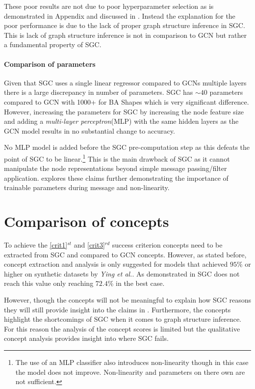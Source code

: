 These poor results are not due to poor hyperparameter selection as is demonstrated in Appendix  and discussed in .
Instead the explanation for the poor performance is due to the lack of proper graph structure inference in SGC.
This is lack of graph structure inference is not in comparison to GCN but rather a fundamental property of SGC.

\paragraph{Comparison of parameters}
Given that SGC uses a single linear regressor compared to GCNs multiple layers there is a large discrepancy in number of parameters.
SGC has $\sim40$ parameters compared to GCN with 1000+ for BA Shapes which is very significant difference.
However, increasing the parameters for SGC by increasing the node feature size and adding a \emph{multi-layer perceptron}(MLP) with the same hidden layers as the GCN model results in no substantial change to accuracy.

No MLP model is added before the SGC pre-computation step as this defeats the point of SGC to be linear.\footnote{The use of an MLP classifier also introduces non-linearity though in this case the model does not improve. Non-linearity and parameters on there own are not sufficient.}
This is the main drawback of SGC as it cannot manipulate the node representations beyond simple message passing/filter application.
 explores these claims further demonstrating the importance of trainable parameters during message and non-linearity.

\section{Comparison of concepts}
\label{sec:comp-concept}

To achieve the \ref{crit1}$^{st}$ and \ref{crit3}$^{rd}$ success criterion concepts need to be extracted from SGC and compared to GCN concepts.
However, as stated before, concept extraction and analysis is only suggested for models that achieved $95$\% or higher on synthetic datasets by \textit{Ying et al.}\cite{ying2019gnnexplainer}.
As demonstrated in  SGC does not reach this value only reaching $72.4$\% in the best case.

However, though the concepts will not be meaningful to explain how SGC reasons they will still provide insight into the claims in .
Furthermore, the concepts highlight the shortcomings of SGC when it comes to graph structure inference.
For this reason the analysis of the concept scores is limited but the qualitative concept analysis provides insight into where SGC fails.

